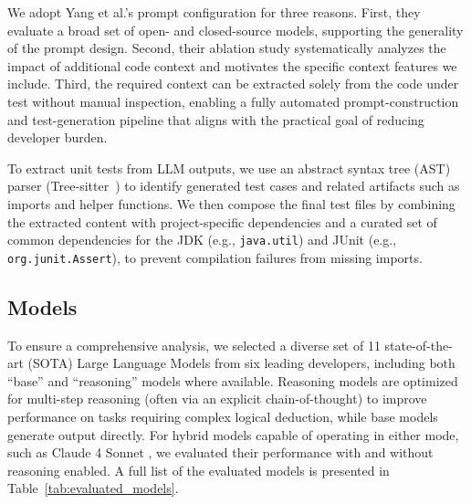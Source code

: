 \documentclass[acmsmall]{acmart}
\begin{document}
We adopt Yang et al.'s prompt configuration for three reasons. First, they evaluate a broad set of open- and closed-source models, supporting the generality of the prompt design. Second, their ablation study systematically analyzes the impact of additional code context and motivates the specific context features we include. Third, the required context can be extracted solely from the code under test without manual inspection, enabling a fully automated prompt-construction and test-generation pipeline that aligns with the practical goal of reducing developer burden.

To extract unit tests from LLM outputs, we use an abstract syntax tree (AST) parser (Tree-sitter~\cite{tree-sitter}) to identify generated test cases and related artifacts such as imports and helper functions. We then compose the final test files by combining the extracted content with project-specific dependencies and a curated set of common dependencies for the JDK (e.g., \texttt{java.util}) and JUnit (e.g., \texttt{org.junit.Assert}), to prevent compilation failures from missing imports.



\subsection{Models}
\label{subsec:models}
To ensure a comprehensive analysis, we selected a diverse set of 11 state-of-the-art (SOTA) Large Language Models from six leading developers, including both ``base'' and ``reasoning'' models where available. Reasoning models are optimized for multi-step reasoning (often via an explicit chain-of-thought) to improve performance on tasks requiring complex logical deduction, while base models generate output directly. For hybrid models capable of operating in either mode, such as Claude 4 Sonnet \cite{anthropic2025claude4sonnet}, we evaluated their performance with and without reasoning enabled. A full list of the evaluated models is presented in Table~\ref{tab:evaluated_models}.
\end{document}
